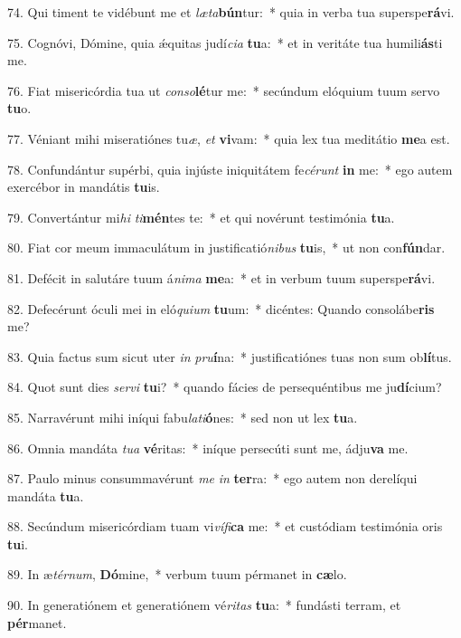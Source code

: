 74. Qui timent te vidébunt me et \textit{læ}\textit{ta}\textbf{bún}tur:~*  quia in verba tua superspe\textbf{rá}vi.\

75. Cognóvi, Dómine, quia ǽquitas judí\textit{ci}\textit{a} \textbf{tu}a:~*  et in veritáte tua humili\textbf{ás}ti me.\

76. Fiat misericórdia tua ut \textit{con}\textit{so}\textbf{lé}tur me:~*  secúndum elóquium tuum servo \textbf{tu}o.\

77. Véniant mihi miseratiónes tu\textit{æ}, \textit{et} \textbf{vi}vam:~*  quia lex tua meditátio \textbf{me}a est.\

78. Confundántur supérbi, quia injúste iniquitátem fe\textit{cé}\textit{runt} \textbf{in} me:~*  ego autem exercébor in mandátis \textbf{tu}is.\

79. Convertántur mi\textit{hi} \textit{ti}\textbf{mén}tes te:~*  et qui novérunt testimónia \textbf{tu}a.\

80. Fiat cor meum immaculátum in justificatió\textit{ni}\textit{bus} \textbf{tu}is,~*  ut non con\textbf{fún}dar.\

81. Defécit in salutáre tuum á\textit{ni}\textit{ma} \textbf{me}a:~*  et in verbum tuum superspe\textbf{rá}vi.\

82. Defecérunt óculi mei in eló\textit{qui}\textit{um} \textbf{tu}um:~*  dicéntes: Quando consolábe\textbf{ris} me?\

83. Quia factus sum sicut uter \textit{in} \textit{pru}\textbf{í}na:~*  justificatiónes tuas non sum ob\textbf{lí}tus.\

84. Quot sunt dies \textit{ser}\textit{vi} \textbf{tu}i?~*  quando fácies de persequéntibus me ju\textbf{dí}cium?\

85. Narravérunt mihi iníqui fabu\textit{la}\textit{ti}\textbf{ó}nes:~*  sed non ut lex \textbf{tu}a.\

86. Omnia mandáta \textit{tu}\textit{a} \textbf{vé}ritas:~*  iníque persecúti sunt me, ádju\textbf{va} me.\

87. Paulo minus consummavérunt \textit{me} \textit{in} \textbf{ter}ra:~*  ego autem non derelíqui mandáta \textbf{tu}a.\

88. Secúndum misericórdiam tuam vi\textit{ví}\textit{fi}\textbf{ca} me:~*  et custódiam testimónia oris \textbf{tu}i.\

89. In æ\textit{tér}\textit{num}, \textbf{Dó}mine,~*  verbum tuum pérmanet in \textbf{cæ}lo.\

90. In generatiónem et generatiónem vé\textit{ri}\textit{tas} \textbf{tu}a:~*  fundásti terram, et \textbf{pér}manet.\


